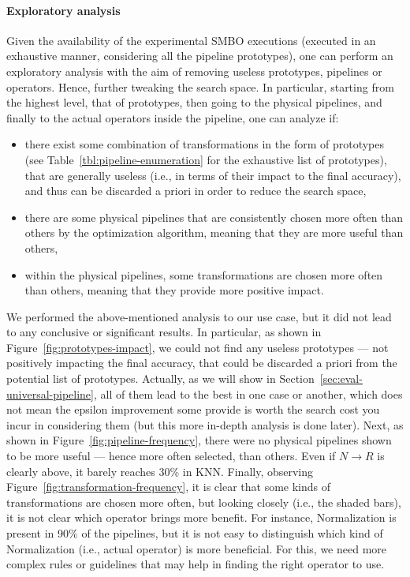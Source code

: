 \paragraph{Exploratory analysis}
Given the availability of the experimental SMBO executions (executed in an exhaustive manner, considering all the pipeline prototypes), one can perform an exploratory analysis with the aim of removing useless prototypes, pipelines or operators. Hence, further tweaking the search space. In particular, starting from the highest level, that of prototypes, then going to the physical pipelines, and finally to the actual operators inside the pipeline, one can analyze if:

\begin{itemize}
    \item there exist some combination of transformations in the form of prototypes (see Table~\ref{tbl:pipeline-enumeration} for the exhaustive list of prototypes), that are generally useless (i.e., in terms of their impact to the final accuracy), and thus can be discarded a priori in order to reduce the search space, 
    \item there are some physical pipelines that are consistently chosen more often than others by the optimization algorithm, meaning that they are more useful than others,
    \item within the physical pipelines, some transformations are chosen more often than others, meaning that they provide more positive impact. 
    \end{itemize}

\begin{example}
We performed the above-mentioned analysis to our use case, but it did not lead to any conclusive or significant results. In particular, as shown in Figure~\ref{fig:prototypes-impact}, we could not find any useless prototypes --- not positively impacting the final accuracy, that could be discarded a priori from the potential list of prototypes.
Actually, as we will show in Section~\ref{sec:eval-universal-pipeline}, all of them lead to the best in one case or another, which does not mean the epsilon improvement some provide is worth the search cost you incur in considering them (but this more in-depth analysis is done later).
Next, as shown in Figure~\ref{fig:pipeline-frequency}, there were no physical pipelines shown to be more useful --- hence more often selected, than others. Even if $N \rightarrow R$ is clearly above, it barely reaches 30\% in KNN.
 Finally, observing Figure~\ref{fig:transformation-frequency}, it is clear that some kinds of transformations are chosen more often, but looking closely (i.e., the shaded bars), it is not clear which operator brings more benefit. For instance, Normalization is present in 90\% of the pipelines, but it is not easy to distinguish which kind of Normalization (i.e., actual operator) is more beneficial.
For this, we need more complex rules or guidelines that may help in finding the right operator to use. 
\end{example}

